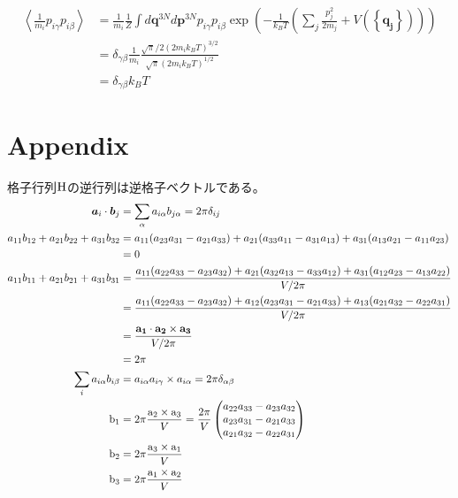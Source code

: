 \documentclass[11pt,a4paper,uplatex]{jsarticle}
\begin{document}
\begin{align}
    \left< \frac{1}{m_{i}} p_{i \gamma} p_{i \beta} \right> &= \frac{1}{m_{i}} \frac{1}{Z} \int d\bm{q}^{3N} d\bm{p}^{3N} p_{i \gamma} p_{i \beta} \exp\left(-\frac{1}{k_{B}T}\left( \sum_{j}\frac{p_{j}^{2}}{2m_{j}} + V\left(\left\{\bm{q_{j}}\right\}\right)\right) \right) \\
    &= \delta_{\gamma \beta} \frac{1}{m_{i}} \frac{\sqrt{\pi}/2 (2m_{i}k_{B}T)^{3/2}}{\sqrt{\pi} (2 m_{i}k_{B}T)^{1/2}}\\
    &= \delta_{\gamma \beta} k_{B} T
\end{align}

\section{Appendix}
格子行列${\rm H}$の逆行列は逆格子ベクトルである。
\begin{align}
    \bm{a}_{i} \cdot \bm{b}_{j}&= \sum_{\alpha} a_{i \alpha} b_{j \alpha} = 2 \pi \delta_{ij} \\
    a_{11} b_{12} + a_{21}  b_{22} + a_{31} b_{32} &=
    a_{11} (a_{23}a_{31}-a_{21}a_{33}) + a_{21} (a_{33}a_{11}-a_{31}a_{13}) + a_{31}(a_{13}a_{21}-a_{11}a_{23})\\ 
    &= 0\\
    a_{11} b_{11} + a_{21}  b_{21} + a_{31} b_{31} &=
    \frac{a_{11} (a_{22}a_{33}-a_{23}a_{32}) + a_{21} (a_{32}a_{13}-a_{33}a_{12}) + a_{31}(a_{12}a_{23}-a_{13}a_{22})}{V/2\pi}\\ 
    &= \frac{a_{11} (a_{22}a_{33}-a_{23}a_{32}) + a_{12} (a_{23}a_{31} -a_{21} a_{33}) + a_{13}(a_{21} a_{32} - a_{22}a_{31})}{V/2\pi}\\
    &= \frac{\bf{a}_{1} \cdot \bf{a}_{2} \times \bf{a}_{3}}{V/2\pi}\\
    &= 2\pi\\
    \sum_{i} a_{i \alpha} b_{i \beta} &= a_{i \alpha} a_{i \gamma}\times a_{i \alpha} =2\pi \delta_{\alpha \beta} \\
    \rm{b}_{1} &= 2\pi \frac{ \rm{a}_{2} \times \rm{a}_{3}}{V} 
            = \frac{2\pi}{V} \begin{pmatrix} a_{22}a_{33} - a_{23}a_{32} \\ a_{23}a_{31} - a_{21}a_{33} \\ a_{21}a_{32} - a_{22}a_{31} \end{pmatrix} \\
    \rm{b}_{2} &= 2\pi \frac{ \rm{a}_{3} \times \rm{a}_{1}}{V} \\
    \rm{b}_{3} &= 2\pi \frac{ \rm{a}_{1} \times \rm{a}_{2}}{V} 
    \end{align}
    
\end{document}

